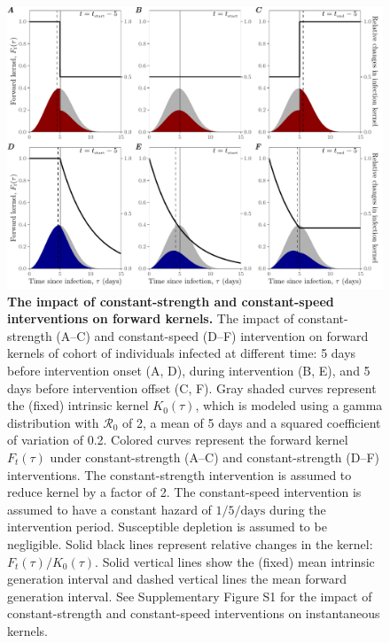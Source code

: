 \documentclass[12pt]{article}
\newcommand{\Rx}[1]{\ensuremath{{\mathcal R}_{#1}}\xspace}
\newcommand{\Ro}{\Rx{0}}
\begin{document}
\begin{figure}[!th]
\includegraphics[width=1\textwidth]{pop_ind_compare.pdf}
\caption{
\textbf{The impact of constant-strength and constant-speed interventions on forward kernels.}
The impact of constant-strength (A--C) and constant-speed (D--F) intervention on forward kernels of cohort of individuals infected at different time:
5 days before intervention onset (A, D), during intervention (B, E), and 5 days before intervention offset (C, F).
Gray shaded curves represent the (fixed) intrinsic kernel $K_0(\tau)$, which is modeled using a gamma distribution with $\Ro$ of 2, a mean of 5 days and a squared coefficient of variation of 0.2.
Colored curves represent the forward kernel $F_t(\tau)$ under constant-strength (A--C) and constant-strength (D--F) interventions.
The constant-strength intervention is assumed to reduce kernel by a factor of 2.
The constant-speed intervention is assumed to have a constant hazard of $1/5/\textrm{days}$ during the intervention period.
Susceptible depletion is assumed to be negligible.
Solid black lines represent relative changes in the kernel: $F_t(\tau)/K_0(\tau)$.
Solid vertical lines show the (fixed) mean intrinsic generation interval and dashed vertical lines the mean forward generation interval.
See Supplementary Figure S1 for the impact of constant-strength and constant-speed interventions on instantaneous kernels.
}
\label{fig:indpop}
\end{figure}
\end{document}
